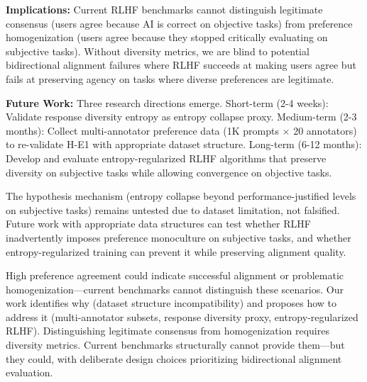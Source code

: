 \textbf{Implications:} Current RLHF benchmarks cannot distinguish legitimate consensus (users agree because AI is correct on objective tasks) from preference homogenization (users agree because they stopped critically evaluating on subjective tasks). Without diversity metrics, we are blind to potential bidirectional alignment failures where RLHF succeeds at making users agree but fails at preserving agency on tasks where diverse preferences are legitimate.

\textbf{Future Work:} Three research directions emerge. Short-term (2-4 weeks): Validate response diversity entropy as entropy collapse proxy. Medium-term (2-3 months): Collect multi-annotator preference data (1K prompts $\times$ 20 annotators) to re-validate H-E1 with appropriate dataset structure. Long-term (6-12 months): Develop and evaluate entropy-regularized RLHF algorithms that preserve diversity on subjective tasks while allowing convergence on objective tasks.

The hypothesis mechanism (entropy collapse beyond performance-justified levels on subjective tasks) remains untested due to dataset limitation, not falsified. Future work with appropriate data structures can test whether RLHF inadvertently imposes preference monoculture on subjective tasks, and whether entropy-regularized training can prevent it while preserving alignment quality.

High preference agreement could indicate successful alignment or problematic homogenization---current benchmarks cannot distinguish these scenarios. Our work identifies why (dataset structure incompatibility) and proposes how to address it (multi-annotator subsets, response diversity proxy, entropy-regularized RLHF). Distinguishing legitimate consensus from homogenization requires diversity metrics. Current benchmarks structurally cannot provide them---but they could, with deliberate design choices prioritizing bidirectional alignment evaluation.

